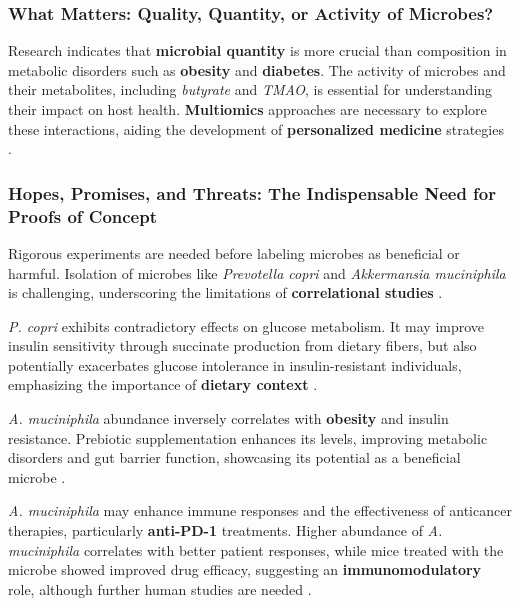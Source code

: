 \subsubsection*{What Matters: Quality, Quantity, or Activity of Microbes?}
Research indicates that \textbf{microbial quantity} is more crucial than composition in metabolic disorders such as \textbf{obesity} and \textbf{diabetes}. The activity of microbes and their metabolites, including \textit{butyrate} and \textit{TMAO}, is essential for understanding their impact on host health. \textbf{Multiomics} approaches are necessary to explore these interactions, aiding the development of \textbf{personalized medicine} strategies \cite*{L9-HumanGut}.

\subsubsection*{Hopes, Promises, and Threats: The Indispensable Need for Proofs of Concept}
Rigorous experiments are needed before labeling microbes as beneficial or harmful. Isolation of microbes like \textit{Prevotella copri} and \textit{Akkermansia muciniphila} is challenging, underscoring the limitations of \textbf{correlational studies} \cite*{L9-HumanGut}.

\textit{P. copri} exhibits contradictory effects on glucose metabolism. It may improve insulin sensitivity through succinate production from dietary fibers, but also potentially exacerbates glucose intolerance in insulin-resistant individuals, emphasizing the importance of \textbf{dietary context} \cite*{L9-HumanGut}.

\textit{A. muciniphila} abundance inversely correlates with \textbf{obesity} and insulin resistance. Prebiotic supplementation enhances its levels, improving metabolic disorders and gut barrier function, showcasing its potential as a beneficial microbe \cite*{L9-HumanGut}.

\textit{A. muciniphila} may enhance immune responses and the effectiveness of anticancer therapies, particularly \textbf{anti-PD-1} treatments. Higher abundance of \textit{A. muciniphila} correlates with better patient responses, while mice treated with the microbe showed improved drug efficacy, suggesting an \textbf{immunomodulatory} role, although further human studies are needed \cite*{L9-HumanGut}.


